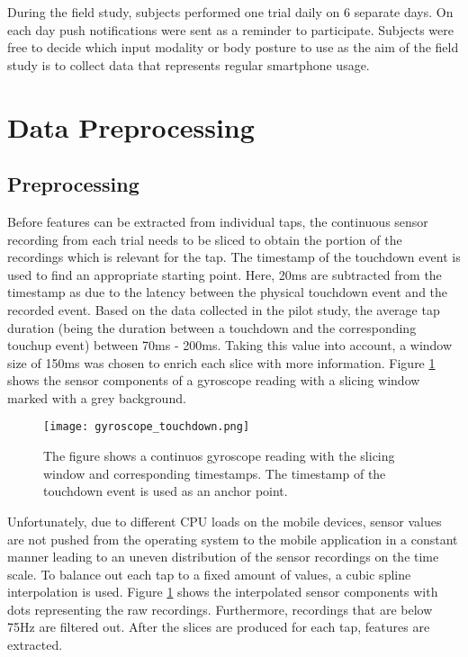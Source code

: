 During the field study, subjects performed one trial daily on 6 separate days. On each day push notifications were sent as a reminder to participate. Subjects were free to decide which input modality or body posture to use as the aim of the field study is to collect data that represents regular smartphone usage.

\section{Data Preprocessing \label{cha:chapter4}}
\subsection{Preprocessing}
Before features can be extracted from individual taps, the continuous sensor recording from each trial needs to be sliced to obtain the portion of the recordings which is relevant for the tap. The timestamp of the touchdown event is used to find an appropriate starting point. Here, 20ms are subtracted from the timestamp as due to the latency between the physical touchdown event and the recorded event. Based on the data collected in the pilot study, the average tap duration (being the duration between a touchdown and the corresponding touchup event) between 70ms - 200ms. Taking this value into account, a window size of 150ms was chosen to enrich each slice with more information. Figure \ref{fig:touchdown} shows the sensor components of a gyroscope reading with a slicing window marked with a grey background. 

\begin{figure}[h!]
  \centering
  \texttt{[image: gyroscope\_touchdown.png]}
  \caption{The figure shows a continuos gyroscope reading with the slicing window and corresponding timestamps. The timestamp of the touchdown event is used as an anchor point.} \label{fig:touchdown}
\end{figure}

Unfortunately, due to different CPU loads on the mobile devices, sensor values are not pushed from the operating system to the mobile application in a constant manner leading to an uneven distribution of the sensor recordings on the time scale. To balance out each tap to a fixed amount of values, a cubic spline interpolation is used. Figure \ref{fig:touchdown} shows the interpolated sensor components with dots representing the raw recordings. Furthermore, recordings that are below 75Hz are filtered out. After the slices are produced for each tap, features are extracted.

